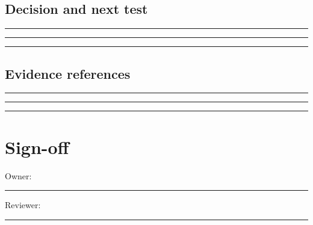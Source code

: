 \documentclass[11pt]{article}
\begin{document}
\subsection{Decision and next test}
\noindent\rule{\linewidth}{0.35pt}\par\vspace{0.22in}
\noindent\rule{\linewidth}{0.35pt}\par\vspace{0.22in}
\noindent\rule{\linewidth}{0.35pt}\par\vspace{0.18in}

\subsection{Evidence references}
\noindent\rule{\linewidth}{0.35pt}\par\vspace{0.22in}
\noindent\rule{\linewidth}{0.35pt}\par\vspace{0.22in}
\noindent\rule{\linewidth}{0.35pt}\par\vspace{0.18in}

\section{Sign-off}
Owner: \rule{0.38\linewidth}{0.4pt}\hfill Reviewer: \rule{0.38\linewidth}{0.4pt}\par
\end{document}
